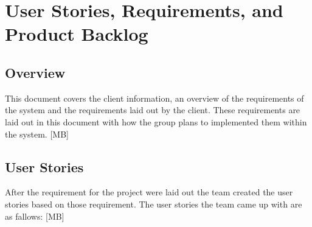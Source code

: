 
\chapter{User Stories,  Requirements, and Product Backlog}
\section{Overview}


\rm This document covers the client information, an overview of the requirements of the system and the requirements laid out by the client. These requirements are laid out in this document with how the group plans to implemented them within the system. [MB]
 

\section{User Stories}
After the requirement for the project were laid out the team created the user stories based on those requirement. The user stories the team came up with are as fallows: [MB]

